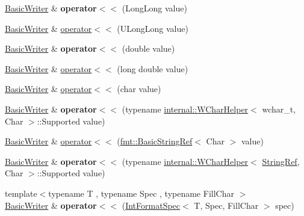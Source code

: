 \begin{DoxyCompactItemize}
\item 
\hyperlink{classfmt_1_1BasicWriter}{Basic\+Writer} \& {\bfseries operator$<$$<$} (Long\+Long value)\hypertarget{classfmt_1_1BasicWriter_a2c876284b0b3b7f36cc0354e3348912a}{}\label{classfmt_1_1BasicWriter_a2c876284b0b3b7f36cc0354e3348912a}

\item 
\hyperlink{classfmt_1_1BasicWriter}{Basic\+Writer} \& \hyperlink{classfmt_1_1BasicWriter_afb01c45f06b2c13027343b74ce973a40}{operator$<$$<$} (U\+Long\+Long value)
\item 
\hyperlink{classfmt_1_1BasicWriter}{Basic\+Writer} \& {\bfseries operator$<$$<$} (double value)\hypertarget{classfmt_1_1BasicWriter_afa435e67e3db3d214f0272b10c0a3878}{}\label{classfmt_1_1BasicWriter_afa435e67e3db3d214f0272b10c0a3878}

\item 
\hyperlink{classfmt_1_1BasicWriter}{Basic\+Writer} \& \hyperlink{classfmt_1_1BasicWriter_a90215ced4a6a9fcd5065f1ffd4105a4b}{operator$<$$<$} (long double value)
\item 
\hyperlink{classfmt_1_1BasicWriter}{Basic\+Writer} \& \hyperlink{classfmt_1_1BasicWriter_a4c7d6b3a40b4083f351de3f9ee0b3818}{operator$<$$<$} (char value)
\item 
\hyperlink{classfmt_1_1BasicWriter}{Basic\+Writer} \& {\bfseries operator$<$$<$} (typename \hyperlink{structfmt_1_1internal_1_1WCharHelper}{internal\+::\+W\+Char\+Helper}$<$ wchar\+\_\+t, Char $>$\+::Supported value)\hypertarget{classfmt_1_1BasicWriter_a83967e3236b090ba035d5fc04317f4ed}{}\label{classfmt_1_1BasicWriter_a83967e3236b090ba035d5fc04317f4ed}

\item 
\hyperlink{classfmt_1_1BasicWriter}{Basic\+Writer} \& \hyperlink{classfmt_1_1BasicWriter_a5f07d053b9f215b548ba3623e7a09212}{operator$<$$<$} (\hyperlink{classfmt_1_1BasicStringRef}{fmt\+::\+Basic\+String\+Ref}$<$ Char $>$ value)
\item 
\hyperlink{classfmt_1_1BasicWriter}{Basic\+Writer} \& {\bfseries operator$<$$<$} (typename \hyperlink{structfmt_1_1internal_1_1WCharHelper}{internal\+::\+W\+Char\+Helper}$<$ \hyperlink{classfmt_1_1BasicStringRef}{String\+Ref}, Char $>$\+::Supported value)\hypertarget{classfmt_1_1BasicWriter_ac0483272173279436f3d47f49894cafb}{}\label{classfmt_1_1BasicWriter_ac0483272173279436f3d47f49894cafb}

\item 
{\footnotesize template$<$typename T , typename Spec , typename Fill\+Char $>$ }\\\hyperlink{classfmt_1_1BasicWriter}{Basic\+Writer} \& {\bfseries operator$<$$<$} (\hyperlink{classfmt_1_1IntFormatSpec}{Int\+Format\+Spec}$<$ T, Spec, Fill\+Char $>$ spec)\hypertarget{classfmt_1_1BasicWriter_a45ded4f76427103f3c189855be8c5d46}{}\label{classfmt_1_1BasicWriter_a45ded4f76427103f3c189855be8c5d46}


\end{DoxyCompactItemize}
